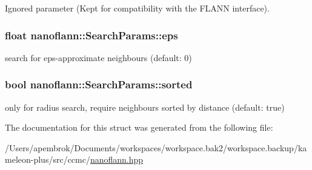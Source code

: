 Ignored parameter (Kept for compatibility with the F\-L\-A\-N\-N interface). 

\hypertarget{structnanoflann_1_1_search_params_a64b9e7c56bbb743694f6188f616a94cc}{
\subsubsection[{eps}]{\setlength{\rightskip}{0pt plus 5cm}float nanoflann\-::\-Search\-Params\-::eps}}\label{structnanoflann_1_1_search_params_a64b9e7c56bbb743694f6188f616a94cc}


search for eps-\/approximate neighbours (default\-: 0) 

\hypertarget{structnanoflann_1_1_search_params_a5126d5f71f1c9163c6a581776a0e9466}{
\subsubsection[{sorted}]{\setlength{\rightskip}{0pt plus 5cm}bool nanoflann\-::\-Search\-Params\-::sorted}}\label{structnanoflann_1_1_search_params_a5126d5f71f1c9163c6a581776a0e9466}


only for radius search, require neighbours sorted by distance (default\-: true) 



The documentation for this struct was generated from the following file\-:\begin{DoxyCompactItemize}
\item 
/\-Users/apembrok/\-Documents/workspaces/workspace.\-bak2/workspace.\-backup/kameleon-\/plus/src/ccmc/\hyperlink{nanoflann_8hpp}{nanoflann.\-hpp}\end{DoxyCompactItemize}
